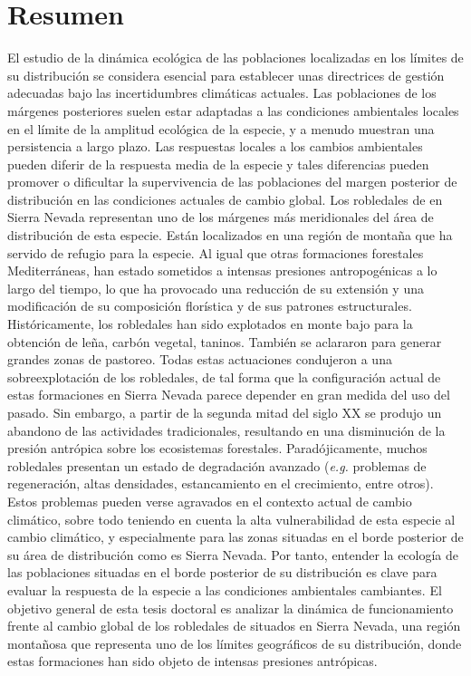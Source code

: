 %

\chapter*{\textcolor{ctcolormain}{Resumen}}\label{sec:resumen}


El estudio de la dinámica ecológica de las poblaciones localizadas en los límites de su distribución se considera esencial para establecer unas directrices de gestión adecuadas bajo las incertidumbres climáticas actuales. Las poblaciones de los márgenes posteriores suelen estar adaptadas a las condiciones ambientales locales en el límite de la amplitud ecológica de la especie, y a menudo muestran una persistencia a largo plazo. Las respuestas locales a los cambios ambientales pueden diferir de la respuesta media de la especie y tales diferencias pueden promover o dificultar la supervivencia de las poblaciones del margen posterior de distribución en las condiciones actuales de cambio global. Los robledales de \Qp en Sierra Nevada representan uno de los márgenes más meridionales del  área de distribución de esta especie. Están localizados en una región de montaña que ha servido de refugio para la especie. Al igual que otras formaciones forestales Mediterráneas, han estado sometidos a intensas presiones antropogénicas a lo largo del tiempo, lo que ha provocado una reducción de su extensión y una modificación de su composición florística y de sus patrones estructurales. Históricamente, los robledales han sido explotados en monte bajo para la obtención de leña, carbón vegetal, taninos. También se aclararon para generar grandes zonas de pastoreo. Todas estas actuaciones condujeron a una sobreexplotación de los robledales, de tal forma que la configuración actual de estas formaciones en Sierra Nevada parece depender en gran medida del uso del pasado. Sin embargo, a partir de la segunda mitad del siglo XX se produjo un abandono de las actividades tradicionales, resultando en una disminución de la presión antrópica sobre los ecosistemas forestales. Paradójicamente, muchos robledales presentan un estado de degradación avanzado (\emph{e.g.} problemas de regeneración, altas densidades, estancamiento en el crecimiento, entre otros). Estos problemas pueden verse agravados en el contexto actual de cambio climático, sobre todo teniendo en cuenta la alta vulnerabilidad de esta especie al cambio climático, y especialmente para las zonas situadas en el borde posterior de su área de distribución como es Sierra Nevada. Por tanto, entender la ecología de las poblaciones situadas en el borde posterior de su distribución es clave para evaluar la respuesta de la especie a las condiciones ambientales cambiantes. El objetivo general de esta tesis doctoral es analizar la dinámica de funcionamiento frente al cambio global de los robledales de \Qp situados en Sierra Nevada, una región montañosa que representa uno de los límites geográficos de su distribución, donde estas formaciones han sido objeto de intensas presiones antrópicas. 

